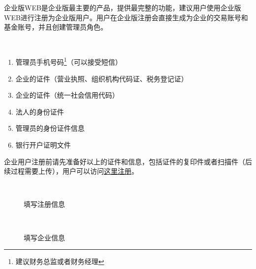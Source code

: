 企业版WEB是企业版最主要的产品，提供最完整的功能，建议用户使用企业版WEB进行注册为企业版用户。用户在企业版注册会直接生成为企业的交易账号和基金账号，并且创建管理员角色。\par

\\
	\begin{enumerate}
		\item 管理员手机号码\footnote{建议财务总监或者财务经理}（可以接受短信）
		\item 企业的证件（营业执照、组织机构代码证、税务登记证）
		\item 企业的证件（统一社会信用代码）
		\item 法人的身份证件
		\item 管理员的身份证件信息
		\item 银行开户证明文件
	\end{enumerate}

企业用户注册前请先准备好以上的证件和信息，包括证件的复印件或者扫描件（后续过程需要上传），用户可以访问\href{https://qy.99fund.com/instReg/register.htm}{这里注册}。\par

\\
\begin{figure}[htbp!]
  \centering
  \caption{填写注册信息}
\end{figure}

\\
\begin{figure}[htbp!]
  \centering
  \caption{填写企业信息}
\end{figure}

